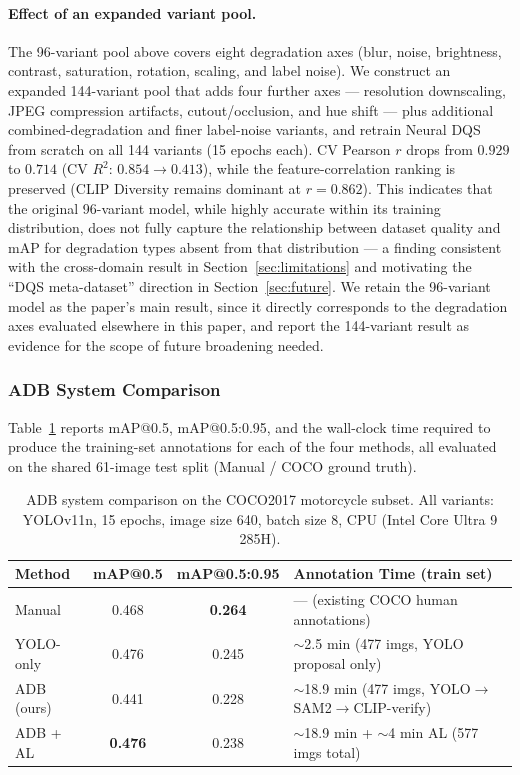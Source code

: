 \documentclass[11pt]{article}
\begin{document}
\paragraph{Effect of an expanded variant pool.} The 96-variant pool above
covers eight degradation axes (blur, noise, brightness, contrast,
saturation, rotation, scaling, and label noise). We construct an expanded
144-variant pool that adds four further axes --- resolution
downscaling, JPEG compression artifacts, cutout/occlusion, and hue shift ---
plus additional combined-degradation and finer label-noise variants, and
retrain Neural DQS from scratch on all 144 variants (15 epochs each). CV
Pearson $r$ drops from $0.929$ to $0.714$ (CV $R^2$: $0.854 \to 0.413$),
while the feature-correlation ranking is preserved (CLIP Diversity remains
dominant at $r=0.862$). This indicates that the original 96-variant model,
while highly accurate within its training distribution, does not fully
capture the relationship between dataset quality and mAP for degradation
types absent from that distribution --- a finding consistent with the
cross-domain result in Section~\ref{sec:limitations} and motivating the
``DQS meta-dataset'' direction in Section~\ref{sec:future}. We retain the
96-variant model as the paper's main result, since it directly corresponds
to the degradation axes evaluated elsewhere in this paper, and report the
144-variant result as evidence for the scope of future broadening needed.

\subsubsection{ADB System Comparison}
\label{sec:main-table}

Table~\ref{tab:main-comparison} reports mAP@0.5, mAP@0.5:0.95, and the
wall-clock time required to produce the training-set annotations for each of
the four methods, all evaluated on the shared 61-image test split (Manual /
COCO ground truth).

\begin{table}[h]
\centering
\caption{ADB system comparison on the COCO2017 motorcycle subset. All
variants: YOLOv11n, 15 epochs, image size 640, batch size 8, CPU (Intel Core
Ultra 9 285H).}
\label{tab:main-comparison}
\begin{tabular}{@{}lccl@{}}
\toprule
Method & mAP@0.5 & mAP@0.5:0.95 & Annotation Time (train set) \\
\midrule
Manual & 0.468 & \textbf{0.264} & --- (existing COCO human annotations) \\
YOLO-only & 0.476 & 0.245 & $\sim$2.5 min (477 imgs, YOLO proposal only) \\
ADB (ours) & 0.441 & 0.228 & $\sim$18.9 min (477 imgs, YOLO$\to$SAM2$\to$CLIP-verify) \\
ADB + AL & \textbf{0.476} & 0.238 & $\sim$18.9 min + $\sim$4 min AL (577 imgs total) \\
\bottomrule
\end{tabular}
\end{table}
\end{document}
